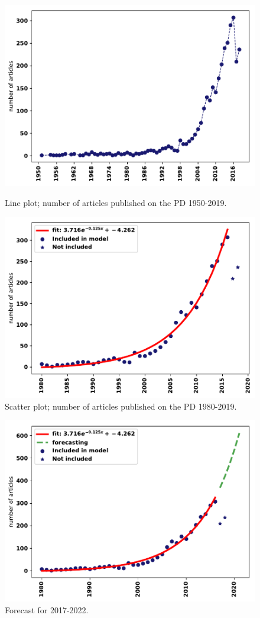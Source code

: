 \documentclass{article}
\theoremstyle{definition}
\begin{document}
\begin{figure}[!hbtp]
\begin{minipage}{.45\textwidth}
    \centering
    \includegraphics[width=.9\textwidth]{./assets/images/timeline.pdf}
    \caption{Line plot; number of articles published on the PD 1950-2019.}\label{fig:timeseries}
\end{minipage}
\begin{minipage}{.45\textwidth}
    \centering
    \includegraphics[width=.9\textwidth]{./assets/images/fitting.pdf}
    \caption{Scatter plot; number of articles published on the PD 1980-2019.}\label{fig:fitting}
\end{minipage}
\end{figure}

\begin{figure}[!hbtp]
    \centering
    \includegraphics[width=.5\textwidth]{./assets/images/forecasting.pdf}
    \caption{Forecast for 2017-2022.}\label{fig:forecasting}
\end{figure}
\end{document}
